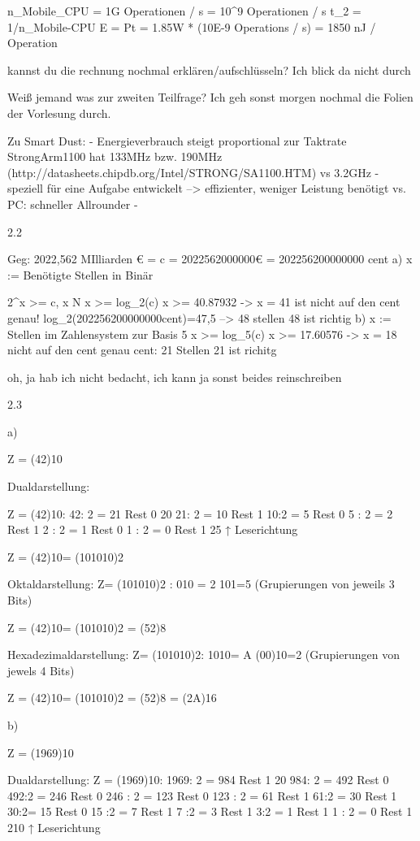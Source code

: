 \documentclass[11pt,a4paper]{article}
\begin{document}
n_{Mobile_CPU} = 1G Operationen / s = 10^9 Operationen / s
t_2 = 1/n_{Mobile-CPU}
E = Pt = 1.85W * (10E-9 Operations / s) = 1850 nJ / Operation

kannst du die rechnung nochmal erklären/aufschlüsseln? Ich blick da nicht durch

Weiß jemand was zur zweiten Teilfrage? Ich geh sonst morgen nochmal die Folien der Vorlesung durch.

Zu Smart Dust: 
- Energieverbrauch steigt proportional zur Taktrate StrongArm1100 hat 133MHz bzw. 190MHz (http://datasheets.chipdb.org/Intel/STRONG/SA1100.HTM) vs 3.2GHz
- speziell für eine Aufgabe entwickelt --> effizienter, weniger Leistung benötigt vs. PC: schneller Allrounder
-

2.2

 Geg: 2022,562 MIlliarden € = c =  2022562000000€ = 202256200000000 cent
a)
x := Benötigte Stellen in Binär

2^x >= c, x \in N
x >= log_2(c)
x >= 40.87932 -> x = 41  ist nicht auf den cent genau!
log_2(202256200000000cent)=47,5 --> 48 stellen
48 ist richtig
b)
x := Stellen im Zahlensystem zur Basis 5
x >= log_5(c)
x >= 17.60576 -> x = 18 nicht auf den cent genau
cent: 21 Stellen
21 ist richitg

oh, ja hab ich nicht bedacht, ich kann ja sonst beides reinschreiben

2.3

a)

Z = (42)10

Dualdarstellung:
    
Z = (42)10:
42: 2 = 21 Rest    0     20
21: 2 = 10 Rest    1
10:2 = 5 Rest       0
5 : 2 = 2 Rest       1 
2 : 2 = 1 Rest        0
1 : 2 = 0 Rest        1    25 ↑ Leserichtung

Z = (42)10=  (101010)2

Oktaldarstellung:
Z= (101010)2 :
010 =  2
101=5
(Grupierungen von jeweils 3 Bits)

Z = (42)10=  (101010)2 = (52)8

Hexadezimaldarstellung:
Z= (101010)2:
1010= A
(00)10=2
(Grupierungen von jewels 4 Bits)

Z = (42)10=  (101010)2 = (52)8 = (2A)16

b)

Z = (1969)10

Dualdarstellung:
Z = (1969)10:
1969: 2 = 984 Rest    1     20
984: 2 = 492 Rest      0
492:2 = 246 Rest       0
246 : 2 = 123 Rest     0
123 : 2 = 61 Rest       1
61:2 = 30 Rest            1
30:2= 15 Rest             0
15 :2 = 7 Rest              1
7 :2 = 3 Rest               1
3:2 = 1 Rest                1 
1 : 2 = 0 Rest               1         210 ↑ Leserichtung
\end{document}
